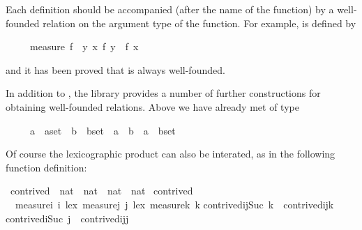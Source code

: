 \begin{isabellebody}
\begin{isamarkuptext}
Each  definition should be accompanied (after the
name of the function) by a well-founded relation on the argument type
of the function. For example,  is defined by
\begin{isabelle}%
\ \ \ \ \ measure\ f\ {\isasymequiv}\ {\isacharbraceleft}{\isacharparenleft}y{\isacharcomma}\ x{\isacharparenright}{\isachardot}\ f\ y\ {\isacharless}\ f\ x{\isacharbraceright}%
\end{isabelle}
and it has been proved that  is always well-founded.

In addition to , the library provides
a number of further constructions for obtaining well-founded relations.
Above we have already met  of type
\begin{isabelle}%
\ \ \ \ \ {\isachardoublequote}{\isacharparenleft}{\isacharprime}a\ {\isasymtimes}\ {\isacharprime}a{\isacharparenright}set\ {\isasymRightarrow}\ {\isacharparenleft}{\isacharprime}b\ {\isasymtimes}\ {\isacharprime}b{\isacharparenright}set\ {\isasymRightarrow}\ {\isacharparenleft}{\isacharparenleft}{\isacharprime}a\ {\isasymtimes}\ {\isacharprime}b{\isacharparenright}\ {\isasymtimes}\ {\isacharparenleft}{\isacharprime}a\ {\isasymtimes}\ {\isacharprime}b{\isacharparenright}{\isacharparenright}set{\isachardoublequote}%
\end{isabelle}
Of course the lexicographic product can also be interated, as in the following
function definition:%
\end{isamarkuptext}%
\ contrived\ {\isacharcolon}{\isacharcolon}\ {\isachardoublequote}nat\ {\isasymtimes}\ nat\ {\isasymtimes}\ nat\ {\isasymRightarrow}\ nat{\isachardoublequote}\isanewline
{}\ contrived\isanewline
\ \ {\isachardoublequote}measure{\isacharparenleft}{\isasymlambda}i{\isachardot}\ i{\isacharparenright}\ {\isacharless}{\isacharasterisk}lex{\isacharasterisk}{\isachargreater}\ measure{\isacharparenleft}{\isasymlambda}j{\isachardot}\ j{\isacharparenright}\ {\isacharless}{\isacharasterisk}lex{\isacharasterisk}{\isachargreater}\ measure{\isacharparenleft}{\isasymlambda}k{\isachardot}\ k{\isacharparenright}{\isachardoublequote}\isanewline
{\isachardoublequote}contrived{\isacharparenleft}i{\isacharcomma}j{\isacharcomma}Suc\ k{\isacharparenright}\ {\isacharequal}\ contrived{\isacharparenleft}i{\isacharcomma}j{\isacharcomma}k{\isacharparenright}{\isachardoublequote}\isanewline
{\isachardoublequote}contrived{\isacharparenleft}i{\isacharcomma}Suc\ j{\isacharcomma}{}{\isacharparenright}\ {\isacharequal}\ contrived{\isacharparenleft}i{\isacharcomma}j{\isacharcomma}j{\isacharparenright}{\isachardoublequote}\isanewline

\end{isabellebody}
